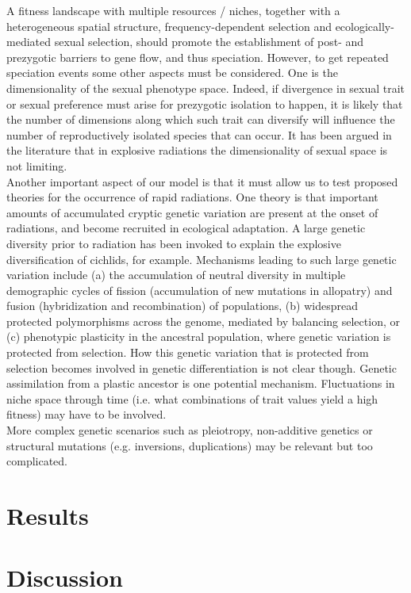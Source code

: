 \documentclass[]{article}
\begin{document}
A fitness landscape with multiple resources / niches, together with a heterogeneous spatial structure, frequency-dependent selection and ecologically-mediated sexual selection, should promote the establishment of post- and prezygotic barriers to gene flow, and thus speciation. However, to get repeated speciation events some other aspects must be considered. One is the dimensionality of the sexual phenotype space. Indeed, if divergence in sexual trait or sexual preference must arise for prezygotic isolation to happen, it is likely that the number of dimensions along which such trait can diversify will influence the number of reproductively isolated species that can occur. It has been argued in the literature that in explosive radiations the dimensionality of sexual space is not limiting.\\

Another important aspect of our model is that it must allow us to test proposed theories for the occurrence of rapid radiations. One theory is that important amounts of accumulated cryptic genetic variation are present at the onset of radiations, and become recruited in ecological adaptation. A large genetic diversity prior to radiation has been invoked to explain the explosive diversification of cichlids, for example. Mechanisms leading to such large genetic variation include (a) the accumulation of neutral diversity in multiple demographic cycles of fission (accumulation of new mutations in allopatry) and fusion (hybridization and recombination) of populations, (b) widespread protected polymorphisms across the genome, mediated by balancing selection, or (c) phenotypic plasticity in the ancestral population, where genetic variation is protected from selection. How this genetic variation that is protected from selection becomes involved in genetic differentiation is not clear though. Genetic assimilation from a plastic ancestor is one potential mechanism. Fluctuations in niche space through time (i.e. what combinations of trait values yield a high fitness) may have to be involved.\\

More complex genetic scenarios such as pleiotropy, non-additive genetics or structural mutations (e.g. inversions, duplications) may be relevant but too complicated.

\section*{Results}

\section*{Discussion}
\end{document}
